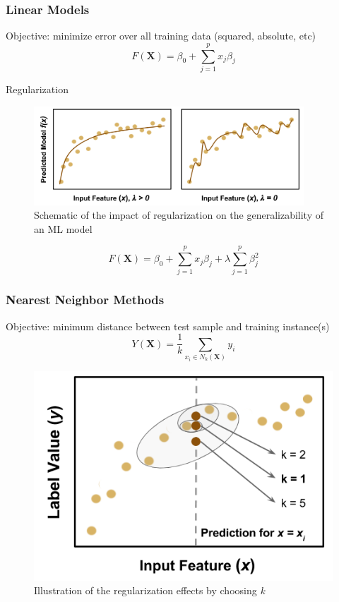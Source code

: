 \begin{frame}
  \frametitle{Linear Models}
  Objective: minimize error over all training data (squared, absolute, etc)
  \begin{equation}
    F(\boldsymbol{X}) = \beta_{0} +  \sum_{j=1}^{p} x_{j} \beta_{j}
  \end{equation}
  
  Regularization
  \begin{figure}[h!]
    \centering
    \includegraphics[width=0.9\textwidth]{./figures/regularization.png}
    \caption{Schematic of the impact of regularization on the generalizability of an ML model}
  \end{figure}
  \begin{equation}
    F(\boldsymbol{X}) = \beta_{0} +  \sum_{j=1}^{p} x_{j} \beta_{j} + \lambda \sum_{j=1}^{p} \beta_{j}^2
  \end{equation}
\end{frame}

\begin{frame}
  \frametitle{Nearest Neighbor Methods}
  Objective: minimum distance between test sample and training instance(s)
  \begin{equation}
    Y(\boldsymbol{X}) = \frac{1}{k} \sum_{x_i \in N_k(\boldsymbol{X})} y_i
  \end{equation}
  \begin{figure}[h!]
    \centering
    \includegraphics[height=0.5\textheight]{./figures/nn-fig.png}
    \caption{Illustration of the regularization effects by choosing \textit{k}}
  \end{figure}
\end{frame}

